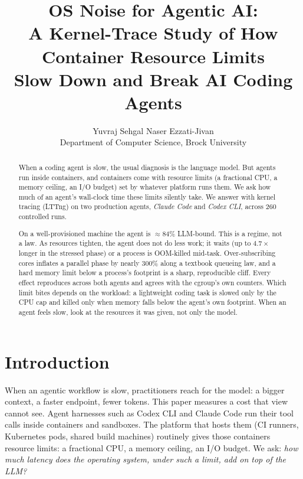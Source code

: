\documentclass[10pt,twocolumn]{article}
\title{\vspace{-2em}\bfseries OS Noise for Agentic AI:\\
A Kernel-Trace Study of How Container Resource Limits\\
Slow Down and Break AI Coding Agents}
\author{Yuvraj Sehgal \quad Naser Ezzati-Jivan\\
\small Department of Computer Science, Brock University}
\date{}
\begin{document}
\maketitle

\begin{abstract}
When a coding agent is slow, the usual diagnosis is the language model. But
agents run inside containers, and containers come with resource limits (a
fractional CPU, a memory ceiling, an I/O budget) set by whatever platform
runs them. We ask how much of an agent's wall-clock time these limits
silently take. We answer with kernel tracing (LTTng) on two production
agents, \emph{Claude Code} and \emph{Codex CLI}, across 260 controlled runs.

On a well-provisioned machine the agent is ${\approx}84\%$ LLM-bound. This
is a regime, not a law. As resources tighten, the agent does not do less
work; it waits (up to $4.7\times$ longer in the stressed phase) or a process
is OOM-killed mid-task. Over-subscribing cores inflates a parallel phase by
nearly $300\%$ along a textbook queueing law, and a hard memory limit below
a process's footprint is a sharp, reproducible cliff. Every effect
reproduces across both agents and agrees with the cgroup's own counters.
Which limit bites depends on the workload: a lightweight coding task is
slowed only by the CPU cap and killed only when memory falls below the
agent's own footprint. When an agent feels slow, look at the
resources it was given, not only the model.
\end{abstract}

\section{Introduction}

When an agentic workflow is slow, practitioners reach for the model: a
bigger context, a faster endpoint, fewer tokens. This paper measures a cost
that view cannot see. Agent harnesses such as Codex CLI and Claude Code run
their tool calls inside containers and sandboxes. The platform that hosts
them (CI runners, Kubernetes pods, shared build machines) routinely gives
those containers resource limits: a fractional CPU, a memory ceiling, an I/O
budget. We ask: \emph{how much latency does the operating system, under such
a limit, add on top of the LLM?}
\end{document}
